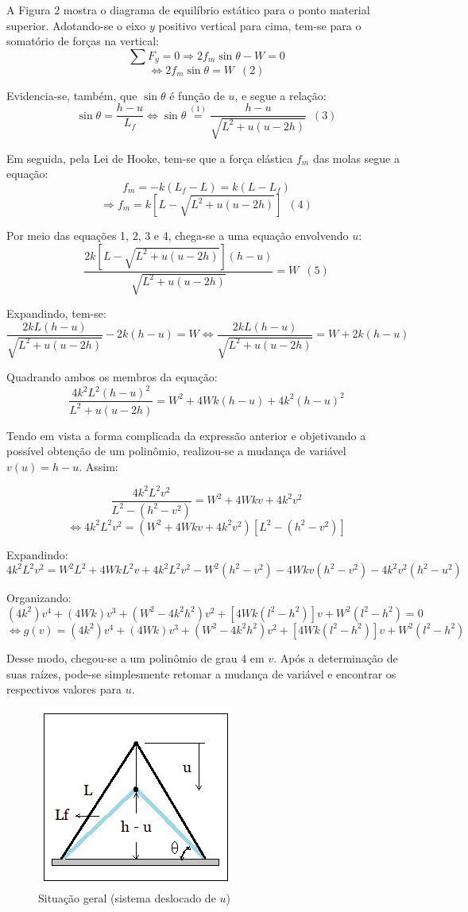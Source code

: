 \documentclass[a4paper, 12pt]{article}
\begin{document}
	A Figura 2 mostra o diagrama de equilíbrio estático para o ponto material superior. Adotando-se o eixo $y$ positivo 
	vertical para cima, tem-se para o somatório de forças na vertical:
	$$\sum F_y=0\Longrightarrow 2f_m\sin \theta -W=0$$ $$\Longleftrightarrow 2f_m\sin \theta =W\,\,\,(2)$$
	
	Evidencia-se, também, que $\sin \theta$ é função de $u$, e segue a relação:
	$$\sin \theta = \frac{h-u}{L_f}\Longleftrightarrow \sin \theta \stackrel{(1)}{=} 
	\frac{h-u}{\sqrt{L^2+u(u-2h)}}\,\,\,(3)$$
	
	Em seguida, pela Lei de Hooke, tem-se que a força elástica $f_m$ das molas segue a equação:
	$$f_m=-k(L_f-L)=k(L-L_f)$$ $$\Longrightarrow f_m=k\left[L-\sqrt{L^2+u(u-2h)}\right]\,\,\,(4)$$
	
	Por meio das equações 1, 2, 3 e 4, chega-se a uma equação envolvendo $u$:
	$$\frac{2k\left[L-\sqrt{L^2+u(u-2h)}\right](h-u)}{\sqrt{L^2+u(u-2h)}}=W\,\,\,(5)$$
	
	\newpage
	
	Expandindo, tem-se: $$\frac{2kL(h-u)}{\sqrt{L^2+u(u-2h)}}-2k(h-u)=W \Longleftrightarrow 
	\frac{2kL(h-u)}{\sqrt{L^2+u(u-2h)}}=W+2k(h-u)$$
	
	Quadrando ambos os membros da equação: $$\frac{4k^2L^2(h-u)^2}{L^2+u(u-2h)}=W^2+4Wk(h-u)+4k^2(h-u)^2$$
	
	Tendo em vista a forma complicada da expressão anterior e objetivando a possível obtenção de um polinômio, 
	realizou-se a mudança de variável $v(u)=h-u$. Assim:
	
	$$\frac{4k^2L^2v^2}{L^2-(h^2-v^2)}=W^2+4Wkv+4k^2v^2$$ 
	$$\Longleftrightarrow 4k^2L^2v^2=(W^2+4Wkv+4k^2v^2)[L^2-(h^2-v^2)]$$
	
	Expandindo: $$4k^2L^2v^2=W^2L^2+4WkL^2v+4k^2L^2v^2-W^2(h^2-v^2)-4Wkv(h^2-v^2)-4k^2v^2(h^2-u^2)$$
	
	Organizando: $$(4k^2)v^4+(4Wk)v^3+(W^2-4k^2h^2)v^2+[4Wk(l^2-h^2)]v+W^2(l^2-h^2)=0$$
	$$\Longleftrightarrow g(v)=(4k^2)v^4+(4Wk)v^3+(W^2-4k^2h^2)v^2+[4Wk(l^2-h^2)]v+W^2(l^2-h^2)$$
	
	Desse modo, chegou-se a um polinômio de grau $4$ em $v$. Após a determinação de suas raízes, pode-se simplesmente 
	retomar a mudança de variável e encontrar os respectivos valores para $u$.
	
	\begin{figure}[!htb]
		\centering
		\includegraphics[scale=0.7]{img6.png}
		\caption{Situação geral (sistema deslocado de $u$)}
	\end{figure}
	
\end{document}
